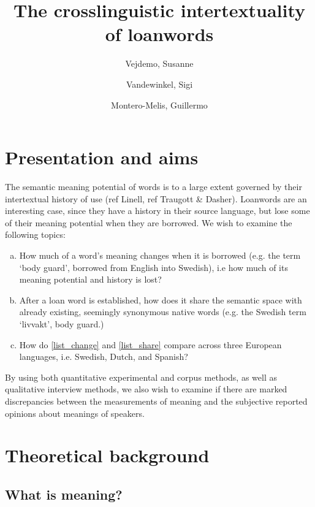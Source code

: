 \documentclass[a4paper]{article}
\title{The crosslinguistic intertextuality of loanwords}
\author{Vejdemo, Susanne \and Vandewinkel, Sigi \and Montero-Melis, Guillermo}
\begin{document}
\maketitle

\thispagestyle{fancy} %


\section{Presentation and aims} 
 
The semantic meaning potential of words is to a large extent governed by their intertextual history of use (ref Linell, ref Traugott \& Dasher).
Loanwords are an interesting case, since they have a history in their source language, but lose some of their meaning potential when they are borrowed.
We wish to examine the following topics:
%
\begin{enumerate}[a.]
	\item \label{list_change} How much of a word's meaning changes when it is borrowed (e.g. the term `body guard', borrowed from English into Swedish), i.e how much of its meaning potential and history is lost?
	\item \label{list_share} After a loan word is established, how does it share the semantic space with already existing, seemingly synonymous native words (e.g. the Swedish term `livvakt', body guard.)
	\item How do \ref{list_change} and \ref{list_share} compare across three European languages, i.e. Swedish, Dutch, and Spanish?
\end{enumerate}
%
By using both quantitative experimental and corpus methods, as well as qualitative interview methods, we also wish to examine if there are marked discrepancies between the measurements of meaning and the subjective reported opinions about meanings of speakers.



\section{Theoretical background}




\subsection{What is meaning?}
\end{document}
